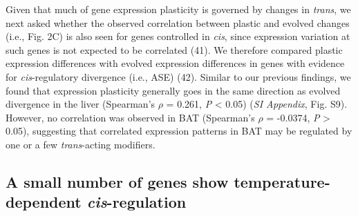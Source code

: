 \documentclass[9pt,twocolumn,twoside,lineno]{pnas-new}
\begin{document}
Given that much of gene expression plasticity is governed by changes in
\emph{trans}, we next asked whether the observed correlation between
plastic and evolved changes (i.e., Fig. 2C) is also seen for genes
controlled in \emph{cis}, since expression variation at such genes is
not expected to be correlated (41). We therefore compared plastic
expression differences with evolved expression differences in genes with
evidence for \emph{cis}-regulatory divergence (i.e., ASE) (42). Similar
to our previous findings, we found that expression plasticity generally
goes in the same direction as evolved divergence in the liver
(Spearman's \(\rho\) = 0.261, \emph{P} \textless{} 0.05) (\emph{SI
Appendix}, Fig. S9). However, no correlation was observed in BAT
(Spearman's \(\rho\) = -0.0374, \emph{P} \textgreater{} 0.05),
suggesting that correlated expression patterns in BAT may be regulated
by one or a few \emph{trans}-acting modifiers.

\hypertarget{a-small-number-of-genes-show-temperature-dependent-cis-regulation}{%
\subsection*{\texorpdfstring{A small number of genes show
temperature-dependent
\emph{cis}-regulation}{A small number of genes show temperature-dependent cis-regulation}}\label{a-small-number-of-genes-show-temperature-dependent-cis-regulation}}
\end{document}
